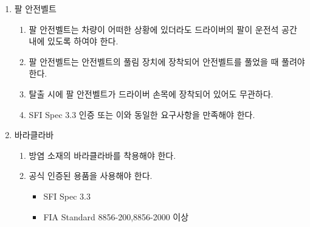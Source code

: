 \documentclass[final,a4paper,10pt]{report}
\begin{document}
\begin{enumerate}
  \item\label{rule:formula-technical.driver-equipment.arm-restraints} 팔 안전벨트
    \begin{enumerate}
      \item\label{rule:formula-technical.driver-equipment.arm-restraints.keeps-arms-within-cockpit} 팔 안전벨트는 차량이 어떠한 상황에 있더라도 드라이버의 팔이 운전석 공간 내에 있도록 하여야 한다.
      \item\label{rule:formula-technical.driver-equipment.arm-restraints.releases-with-seatbelt} 팔 안전벨트는 안전벨트의 풀림 장치에 장착되어 안전벨트를 풀었을 때 풀려야 한다.
      \item\label{rule:formula-technical.driver-equipment.arm-restraints.wrist-mounted-during-egress} 탈출 시에 팔 안전벨트가 드라이버 손목에 장착되어 있어도 무관하다.
      \item\label{rule:formula-technical.driver-equipment.arm-restraints.accepted-certification-standards} SFI Spec 3.3 인증 또는 이와 동일한 요구사항을 만족해야 한다.
    \end{enumerate}
  \item\label{rule:formula-technical.driver-equipment.balaclava} 바라클라바
    \begin{enumerate}
      \item\label{rule:formula-technical.driver-equipment.balaclava.flame-resistant-material} 방염 소재의 바라클라바를 착용해야 한다.

      \item\label{rule:formula-technical.driver-equipment.balaclava.accepted-certification-standards} 공식 인증된 용품을 사용해야 한다.
        \begin{itemize}
          \item SFI Spec 3.3
          \item FIA Standard 8856-200,8856-2000 이상
        \end{itemize}
    \end{enumerate}
\end{enumerate}
\end{document}

